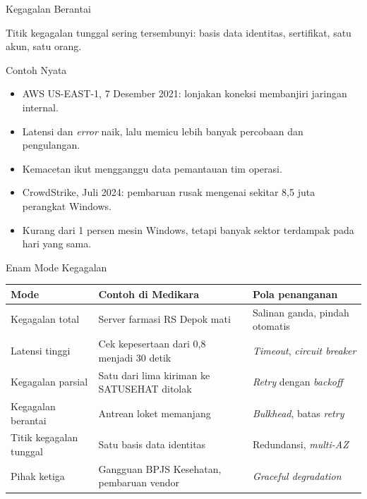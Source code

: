 \documentclass[aspectratio=169, table, 12pt]{beamer}
\begin{document}
\begin{frame}{{\Large Kegagalan Berantai}}
  \centering

  \vspace{6pt}
  {\small Titik kegagalan tunggal sering tersembunyi: basis data identitas, sertifikat, satu
  akun, satu orang.}
\end{frame}

\begin{frame}{{\Large Contoh Nyata}}
  \vspace{6pt}
  \small
  \begin{itemize}
    \item AWS US-EAST-1, 7 Desember 2021: lonjakan koneksi membanjiri jaringan internal.
    \item Latensi dan \textit{error} naik, lalu memicu lebih banyak percobaan dan pengulangan.
    \item Kemacetan ikut mengganggu data pemantauan tim operasi.
    \item CrowdStrike, Juli 2024: pembaruan rusak mengenai sekitar 8,5 juta perangkat Windows.
    \item Kurang dari 1 persen mesin Windows, tetapi banyak sektor terdampak pada hari yang sama.
  \end{itemize}
\end{frame}

\begin{frame}{{\Large Enam Mode Kegagalan}}
  \scriptsize
  \begin{tabularx}{\textwidth}{>{\raggedright\arraybackslash}p{3.0cm}
      >{\raggedright\arraybackslash}X >{\raggedright\arraybackslash}p{3.6cm}}
    \hline
    \textbf{Mode} & \textbf{Contoh di Medikara} & \textbf{Pola penanganan} \\
    \hline
    Kegagalan total & Server farmasi RS Depok mati & Salinan ganda, pindah otomatis \\
    \hline
    Latensi tinggi & Cek kepesertaan dari 0,8 menjadi 30 detik & \textit{Timeout},
      \textit{circuit breaker} \\
    \hline
    Kegagalan parsial & Satu dari lima kiriman ke SATUSEHAT ditolak & \textit{Retry} dengan
      \textit{backoff} \\
    \hline
    Kegagalan berantai & Antrean loket memanjang & \textit{Bulkhead}, batas \textit{retry} \\
    \hline
    Titik kegagalan tunggal & Satu basis data identitas & Redundansi, \textit{multi-AZ} \\
    \hline
    Pihak ketiga & Gangguan BPJS Kesehatan, pembaruan vendor & \textit{Graceful degradation} \\
    \hline
  \end{tabularx}
\end{frame}
\end{document}
